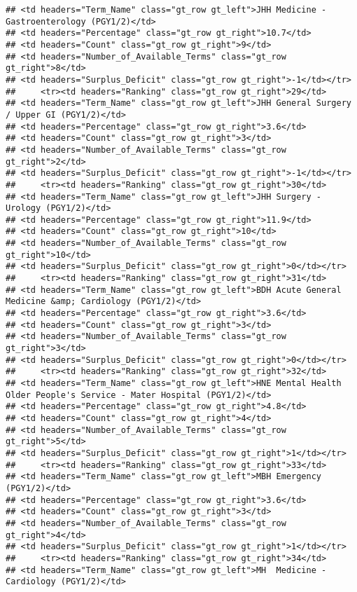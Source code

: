 \documentclass[
]{article}
\begin{document}
\begin{verbatim}
## <td headers="Term_Name" class="gt_row gt_left">JHH Medicine - Gastroenterology (PGY1/2)</td>
## <td headers="Percentage" class="gt_row gt_right">10.7</td>
## <td headers="Count" class="gt_row gt_right">9</td>
## <td headers="Number_of_Available_Terms" class="gt_row gt_right">8</td>
## <td headers="Surplus_Deficit" class="gt_row gt_right">-1</td></tr>
##     <tr><td headers="Ranking" class="gt_row gt_right">29</td>
## <td headers="Term_Name" class="gt_row gt_left">JHH General Surgery / Upper GI (PGY1/2)</td>
## <td headers="Percentage" class="gt_row gt_right">3.6</td>
## <td headers="Count" class="gt_row gt_right">3</td>
## <td headers="Number_of_Available_Terms" class="gt_row gt_right">2</td>
## <td headers="Surplus_Deficit" class="gt_row gt_right">-1</td></tr>
##     <tr><td headers="Ranking" class="gt_row gt_right">30</td>
## <td headers="Term_Name" class="gt_row gt_left">JHH Surgery - Urology (PGY1/2)</td>
## <td headers="Percentage" class="gt_row gt_right">11.9</td>
## <td headers="Count" class="gt_row gt_right">10</td>
## <td headers="Number_of_Available_Terms" class="gt_row gt_right">10</td>
## <td headers="Surplus_Deficit" class="gt_row gt_right">0</td></tr>
##     <tr><td headers="Ranking" class="gt_row gt_right">31</td>
## <td headers="Term_Name" class="gt_row gt_left">BDH Acute General Medicine &amp; Cardiology (PGY1/2)</td>
## <td headers="Percentage" class="gt_row gt_right">3.6</td>
## <td headers="Count" class="gt_row gt_right">3</td>
## <td headers="Number_of_Available_Terms" class="gt_row gt_right">3</td>
## <td headers="Surplus_Deficit" class="gt_row gt_right">0</td></tr>
##     <tr><td headers="Ranking" class="gt_row gt_right">32</td>
## <td headers="Term_Name" class="gt_row gt_left">HNE Mental Health Older People's Service - Mater Hospital (PGY1/2)</td>
## <td headers="Percentage" class="gt_row gt_right">4.8</td>
## <td headers="Count" class="gt_row gt_right">4</td>
## <td headers="Number_of_Available_Terms" class="gt_row gt_right">5</td>
## <td headers="Surplus_Deficit" class="gt_row gt_right">1</td></tr>
##     <tr><td headers="Ranking" class="gt_row gt_right">33</td>
## <td headers="Term_Name" class="gt_row gt_left">MBH Emergency (PGY1/2)</td>
## <td headers="Percentage" class="gt_row gt_right">3.6</td>
## <td headers="Count" class="gt_row gt_right">3</td>
## <td headers="Number_of_Available_Terms" class="gt_row gt_right">4</td>
## <td headers="Surplus_Deficit" class="gt_row gt_right">1</td></tr>
##     <tr><td headers="Ranking" class="gt_row gt_right">34</td>
## <td headers="Term_Name" class="gt_row gt_left">MH  Medicine - Cardiology (PGY1/2)</td>

\end{verbatim}
\end{document}
